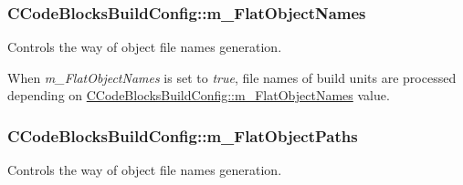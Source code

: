\hypertarget{classCCodeBlocksBuildConfig_a1e3f7ffab14887951b2d8d743354e786}{
\subsubsection[{m\-\_\-\-Flat\-Object\-Names}]{\setlength{\rightskip}{0pt plus 5cm}C\-Code\-Blocks\-Build\-Config\-::m\-\_\-\-Flat\-Object\-Names\hspace{0.3cm}{\ttfamily [private]}}}\label{classCCodeBlocksBuildConfig_a1e3f7ffab14887951b2d8d743354e786}


Controls the way of object file names generation. 

When {\itshape m\-\_\-\-Flat\-Object\-Names} is set to {\itshape true}, file names of build units are processed depending on \hyperlink{classCCodeBlocksBuildConfig_a1e3f7ffab14887951b2d8d743354e786}{C\-Code\-Blocks\-Build\-Config\-::m\-\_\-\-Flat\-Object\-Names} value. \hypertarget{classCCodeBlocksBuildConfig_a0bcabddaab973e27b714855c082a2cbd}{
\subsubsection[{m\-\_\-\-Flat\-Object\-Paths}]{\setlength{\rightskip}{0pt plus 5cm}C\-Code\-Blocks\-Build\-Config\-::m\-\_\-\-Flat\-Object\-Paths\hspace{0.3cm}{\ttfamily [private]}}}\label{classCCodeBlocksBuildConfig_a0bcabddaab973e27b714855c082a2cbd}


Controls the way of object file names generation. 

